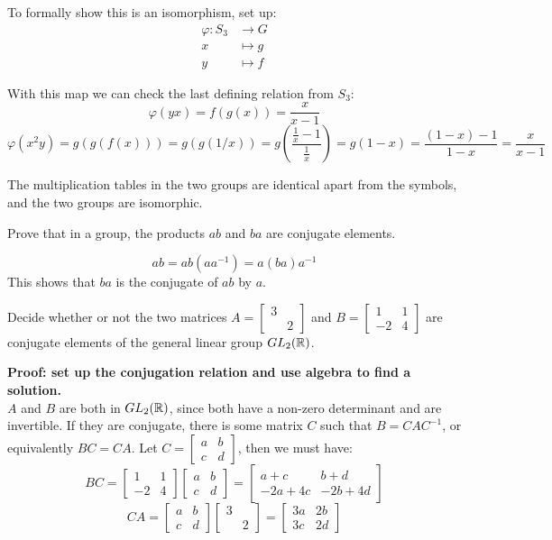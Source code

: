 \documentclass{article}
\begin{document}
To formally show this is an isomorphism, set up:
\begin{align*}
    \varphi: S_3 & \to G     \\
    x            & \mapsto g \\
    y            & \mapsto f
\end{align*}

With this map we can check the last defining relation from $S_3$:
$$\varphi(yx) = f(g(x)) = \frac{x}{x-1}$$
$$\varphi(x^2 y) = g(g(f(x))) = g(g(1/x)) = g\left(\frac{\frac{1}{x} - 1}{\frac{1}{x}}\right) = g(1-x) = \frac{(1 - x) - 1}{1 - x} = \frac{x}{x-1}$$

The multiplication tables in the two groups are identical apart from the symbols, and the two groups are isomorphic.

\begin{problem}
Prove that in a group, the products $ab$ and $ba$ are conjugate elements.
\end{problem}
$$ ab = ab(aa^{-1}) = a(ba)a^{-1}$$
This shows that $ba$ is the conjugate of $ab$ by $a$.

\begin{problem}
Decide whether or not the two matrices $A = \begin{bmatrix} 3 & \\ & 2\end{bmatrix}$ and $B = \begin{bmatrix} 1 & 1 \\ -2 & 4\end{bmatrix}$ are conjugate elements of the general linear group $GL_2(\mathbb{R})$.
\end{problem}

\textbf{Proof: set up the conjugation relation and use algebra to find a solution.}
\\

$A$ and $B$ are both in $GL_2(\mathbb{R})$, since both have a non-zero determinant and are invertible. If they are conjugate, there is some matrix $C$ such that $B = CAC^{-1}$, or equivalently $BC = CA$. Let $C = \begin{bmatrix} a & b \\ c & d\end{bmatrix}$, then we must have:
$$BC = \begin{bmatrix} 1 & 1 \\ -2 & 4\end{bmatrix}\begin{bmatrix} a & b \\ c & d\end{bmatrix} = \begin{bmatrix}a + c & b + d \\ -2a + 4c & -2b + 4d\end{bmatrix}$$
$$CA = \begin{bmatrix} a & b \\ c & d\end{bmatrix}\begin{bmatrix} 3 & \\ & 2\end{bmatrix} = \begin{bmatrix} 3a & 2b \\ 3c & 2d\end{bmatrix}$$
\end{document}
